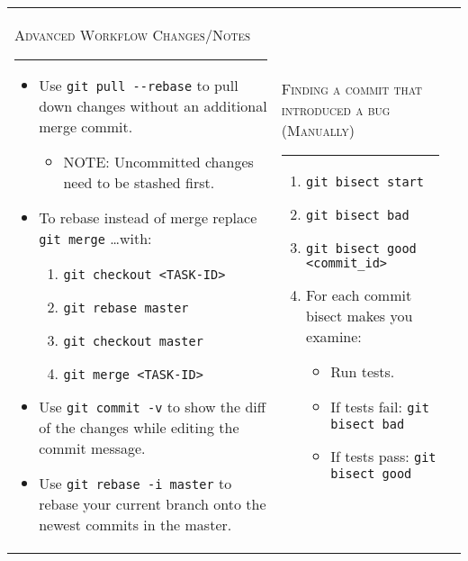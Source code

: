 \documentclass[landscape]{article}
\begin{document}
\begin{tabular*}{10.5in}{|p{2.9in}|p{2.9in}|p{2.9in}|}
\begin{flushleft}
        \textsc{Advanced Workflow Changes/Notes}
        \rule{2.9in}{.5pt}
        \small
        \begin{itemize}
            \item{Use \verb!git pull --rebase! to pull down changes without an
                additional merge commit.}
                \begin{itemize}
                    \item{NOTE: Uncommitted changes need to be stashed first.}
                \end{itemize}
            \item{To rebase instead of merge replace \verb!git merge! \ldots with:}
                \begin{enumerate}
                    \item{\verb!git checkout <TASK-ID>!}
                    \item{\verb!git rebase master!}
                    \item{\verb!git checkout master!}
                    \item{\verb!git merge <TASK-ID>!}
                \end{enumerate}
            \item{Use \verb!git commit -v! to show the diff of the changes
                while editing the commit message.}
            \item{Use \verb!git rebase -i master! to rebase your current branch
                onto the newest commits in the master.}
        \end{itemize}
    \end{flushleft}
    &
    \begin{flushleft}
        \textsc{Finding a commit that introduced a bug (Manually)}
        \rule{2.9in}{.5pt}
        \small
        \begin{enumerate}
            \item{\verb!git bisect start!}
            \item{\verb!git bisect bad!}
            \item{\verb!git bisect good <commit_id>!}
            \item{For each commit bisect makes you examine:}
                \begin{itemize}
                    \item{Run tests.}
                    \item{If tests fail: \verb!git bisect bad!}
                    \item{If tests pass: \verb!git bisect good!}

\end{itemize}
\end{enumerate}
\end{flushleft}
\end{tabular*}
\end{document}
